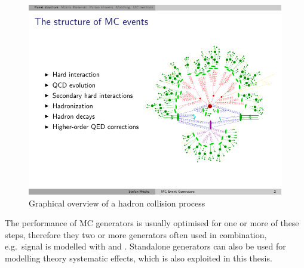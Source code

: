 \begin{figure}[htbp]
  \centering
  \leavevmode
  \includegraphics[width=0.7\columnwidth]{MC_simulation_graphics}
  \caption{Graphical overview of a hadron collision process \autocite{Hoeche_slides}}
  \label{fig:MC_simulation_graphics}
\end{figure}

The performance of MC generators is usually optimised for one or more of these steps, therefore they two or more
generators often used in combination, e.g.\ \ttbar signal is modelled with \MADGRAPH and \PYTHIA. Standalone generators
can also be used for modelling theory systematic effects, which is also exploited in this thesis.

